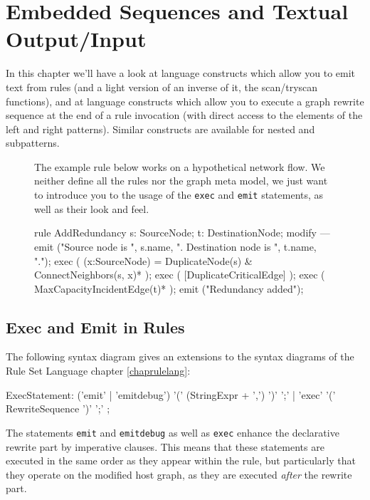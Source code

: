 \chapter{Embedded Sequences and Textual Output/Input}
\label{cha:imperativeandstate}
\label{sct:imperative}

In this chapter we'll have a look at language constructs which allow you to emit text from rules (and a light version of an inverse of it, the scan/tryscan functions), and at language constructs which allow you to execute a graph rewrite sequence at the end of a rule invocation (with direct access to the elements of the left and right patterns).
Similar constructs are available for nested and subpatterns.

\begin{figure}[htbp]
\begin{example}
	The example rule below works on a hypothetical network flow.
	We neither define all the rules nor the graph meta model,
	we just want to introduce you to the usage of the \texttt{exec} and \texttt{emit} statements, as well as their look and feel.
	\begin{grgen}
rule AddRedundancy
{
  s: SourceNode;
  t: DestinationNode;
  modify {
  ---
    emit ("Source node is ", s.name, ". Destination node is ", t.name, ".");
    exec ( (x:SourceNode) = DuplicateNode(s) & ConnectNeighbors(s, x)* );
    exec ( [DuplicateCriticalEdge] );
    exec ( MaxCapacityIncidentEdge(t)* );
    emit ("Redundancy added");
  }
}
	\end{grgen}
\end{example}
\end{figure}

\section{Exec and Emit in Rules}\label{sct:execemitrules}

The following syntax diagram gives an extensions to the syntax diagrams of the Rule Set Language chapter \ref{chaprulelang}:
\begin{rail}
  ExecStatement: ('emit' | 'emitdebug') '(' (StringExpr + ',') ')' ';' | 'exec' '(' RewriteSequence ')' ';'
	;
\end{rail}

The statements \texttt{emit} and \texttt{emitdebug} as well as \texttt{exec} enhance the declarative rewrite part by imperative clauses.
This means that these statements are executed in the same order as they appear within the rule,
but particularly that they operate on the modified host graph, as they are executed \emph{after} the rewrite part.

